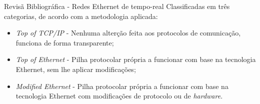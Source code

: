\begin{frame}{Revis\~{a} Bibliogr\'{a}fica - Redes Ethernet de tempo-real}
	\large
	Classificadas em tr\^{e}s categorias, de acordo com a metodologia aplicada:
	\begin{itemize}
		\item \emph{Top of TCP/IP} - Nenhuma alterç\~{a}o feita aos protocolos de comunicaç\~{a}o, funciona de forma transparente;
		\item \emph{Top of Ethernet} - Pilha protocolar própria a funcionar com base na tecnologia Ethernet, sem lhe aplicar modificações;
		\item \emph{Modified Ethernet} - Pilha protocolar própria a funcionar com base na tecnologia Ethernet com modificações de protocolo ou de \emph{hardware}.
	\end{itemize}
\end{frame}